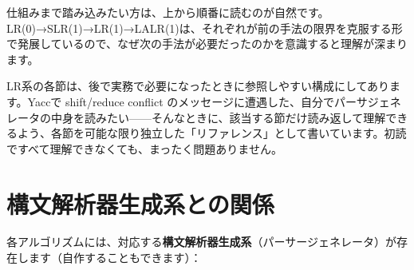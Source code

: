 仕組みまで踏み込みたい方は、上から順番に読むのが自然です。LR(0)→SLR(1)→LR(1)→LALR(1)は、それぞれが前の手法の限界を克服する形で発展しているので、なぜ次の手法が必要だったのかを意識すると理解が深まります。

LR系の各節は、後で実務で必要になったときに参照しやすい構成にしてあります。Yaccで
shift/reduce conflict
のメッセージに遭遇した、自分でパーサジェネレータの中身を読みたい------そんなときに、該当する節だけ読み返して理解できるよう、各節を可能な限り独立した「リファレンス」として書いています。初読ですべて理解できなくても、まったく問題ありません。

\hypertarget{chapter5-ux69cbux6587ux89e3ux6790ux5668ux751fux6210ux7cfbux3068ux306eux95a2ux4fc2}{%
\section{構文解析器生成系との関係}\label{chapter5-ux69cbux6587ux89e3ux6790ux5668ux751fux6210ux7cfbux3068ux306eux95a2ux4fc2}}

各アルゴリズムには、対応する\textbf{構文解析器生成系}（パーサージェネレータ）が存在します（自作することもできます）：


